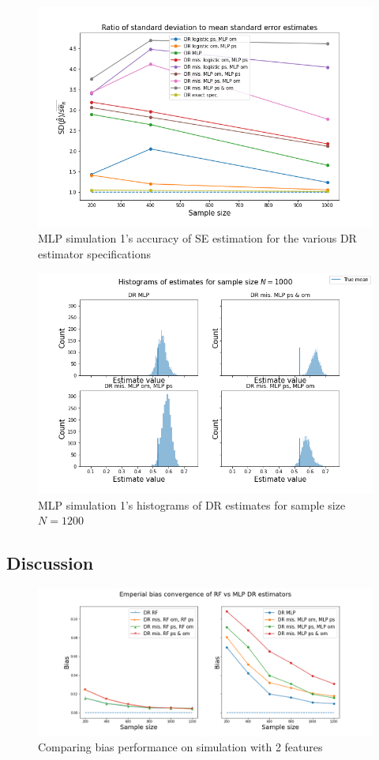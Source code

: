 \documentclass[12pt,twoside]{article}
\begin{document}
\begin{figure}[h!]
    \centering
    \includegraphics[width = 0.9\columnwidth]{figures/SEMLP_moreW.png}
    \caption{MLP simulation 1's accuracy of \citet{lunceford_davidian} SE estimation for the various DR estimator specifications}
    \label{figSEMLP_moreW}
\end{figure}

\begin{figure}[h!]
    \centering
    \includegraphics[width = 0.9\columnwidth]{figures/histMLP_moreW.png}
    \caption{MLP simulation 1's histograms of DR estimates for sample size $N = 1200$}
    \label{fighistMLP_moreW}
\end{figure}

\clearpage
\subsection{Discussion}
\begin{figure}[h!]
    \centering
    \includegraphics[width = 0.9\columnwidth]{figures/biascompare.png}
    \caption{Comparing bias performance on simulation with 2 features}
    \label{fig:my_label}
\end{figure}
\end{document}

